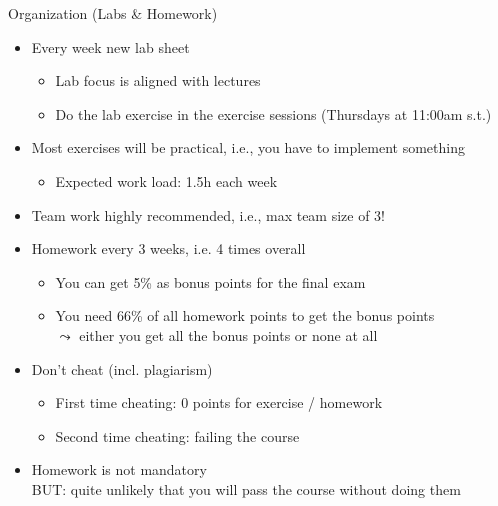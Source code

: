 \documentclass[aspectratio=169]{../latex_main/tntbeamer}  %
\begin{document}
\begin{frame}[c]{Organization (Labs \& Homework)}

\begin{itemize}
  \item Every week new lab sheet
  \begin{itemize}
      \item Lab focus is aligned with lectures
      \item Do the lab exercise in the exercise sessions (Thursdays at 11:00am s.t.)
  \end{itemize}
  \item Most exercises will be practical, i.e., you have to implement something
  \begin{itemize}
    \item Expected work load: 1.5h each week
  \end{itemize}
  \item Team work highly recommended, i.e., max team size of 3!
  \pause
  \item Homework every 3 weeks, i.e. 4 times overall
  \begin{itemize}
      \item You can get \alert{5\% as bonus points} for the final exam
      \item You need 66\% of all homework points to get the bonus points\\
      $\leadsto$ either you get all the bonus points or none at all
  \end{itemize}
  \pause
  \item Don't cheat (incl. plagiarism)
  \begin{itemize}
    \item First time cheating: $0$ points for exercise / homework
    \item Second time cheating: failing the course
  \end{itemize}
  \pause
  \item Homework is not mandatory\\ \alert{BUT: quite unlikely that you will pass the course without doing them}
  \pause
\end{itemize}

\end{frame}
\end{document}
